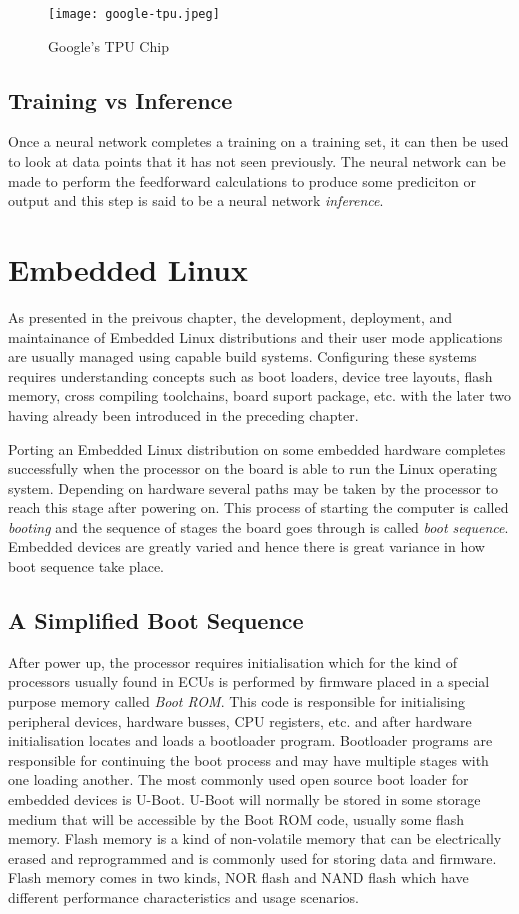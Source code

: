 \begin{figure}[h]
	\centering
	\texttt{[image: google-tpu.jpeg]}
	\caption{Google's TPU Chip}
	\label{fig:google-tpu}
\end{figure}

\subsection{Training vs Inference}

Once a neural network completes a training on a training set, it can then be used to look at data points that it has not seen previously. The neural network can be made to perform the feedforward calculations to produce some prediciton or output and this step is said to be a neural network \textit{inference}.

\section{Embedded Linux}

As presented in the preivous chapter, the development, deployment, and maintainance of Embedded Linux distributions and their user mode applications are usually managed using capable build systems. Configuring these systems requires understanding concepts such as boot loaders, device tree layouts, flash memory, cross compiling toolchains, board suport package, etc. with the later two having already been introduced in the preceding chapter.

Porting an Embedded Linux distribution on some embedded hardware completes successfully when the processor on the board is able to run the Linux operating system. Depending on hardware several paths may be taken by the processor to reach this stage after powering on. This process of starting the computer is called \textit{booting} and the sequence of stages the board goes through is called \textit{boot sequence}. Embedded devices are greatly varied and hence there is great variance in how boot sequence take place.

\subsection{A Simplified Boot Sequence}

After power up, the processor requires initialisation which for the kind of processors usually found in ECUs is performed by firmware placed in a special purpose memory called \textit{Boot ROM}. This code is responsible for initialising peripheral devices, hardware busses, CPU registers, etc. and after hardware initialisation locates and loads a bootloader program. Bootloader programs are responsible for continuing the boot process and may have multiple stages with one loading another. The most commonly used open source boot loader for embedded devices is U-Boot. U-Boot will normally be stored in some storage medium that will be accessible by the Boot ROM code, usually some flash memory. Flash memory is a kind of non-volatile memory that can be electrically erased and reprogrammed and is commonly used for storing data and firmware. Flash memory comes in two kinds, NOR flash and NAND flash which have different performance characteristics and usage scenarios.

